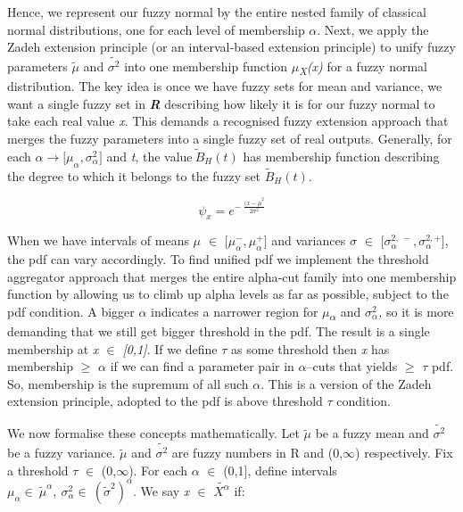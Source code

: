 \documentclass[12pt,a4paper]{report}
\numberwithin{equation}{section}
\begin{document}
Hence, we represent our fuzzy normal by the entire nested family of
classical normal distributions, one for each level of membership
\emph{$\alpha$}. Next, we apply the Zadeh extension principle (or an
interval‐based extension principle) to unify fuzzy parameters
\(\widetilde{\mu}\) and \(\widetilde{\sigma^{2}}\) into one membership
function \emph{$\mu$\textsubscript{X}(x)} for a fuzzy normal distribution.
The key idea is once we have fuzzy sets for mean and variance, we want a
single fuzzy set in \emph{\textbf{R}} describing how likely it is for
our fuzzy normal to take each real value \emph{x}. This demands a
recognised fuzzy extension approach that merges the fuzzy parameters
into a single fuzzy set of real outputs. Generally, for each
\({\alpha \longrightarrow \lbrack\mu}_{\alpha},\sigma_{\alpha}^{2}\rbrack\)
and \emph{t}, the value\({\widetilde{\ B}}_{H}(t)\) has membership
function describing the degree to which it belongs to the fuzzy set
\({\widetilde{B}}_{H}(t).\)

\[\psi_{x} = e^{- \ \frac{{(x - \mu}^{2}}{2\sigma^{2}}}\]

When we have intervals of means \emph{$\mu$ $\in$}
\(\lbrack\mu_{\alpha}^{-},\mu_{\alpha}^{+}\rbrack\) and variances
\emph{$\sigma$ $\in$}
\(\lbrack\sigma_{\alpha}^{2,\  -},\sigma_{\alpha}^{2, +}\rbrack\), the
pdf can vary accordingly. To find unified pdf we implement the threshold
aggregator approach that merges the entire alpha‐cut family into one
membership function by allowing us to climb up alpha levels as far as
possible, subject to the pdf condition. A bigger \emph{$\alpha$} indicates a
narrower region for \emph{$\mu$\textsubscript{$\alpha$}} and
\(\sigma_{\alpha}^{2}\)\emph{,} so it is more demanding that we still
get bigger threshold in the pdf. The result is a single membership at
\emph{x $\in$ {[}0,1{]}}. If we define \emph{$\tau$} as some threshold then
\emph{x} has membership $\geq$ \emph{$\alpha$} if we can find a parameter pair in
$\alpha$--cuts that yields $\geq$ \emph{$\tau$} pdf. So, membership is the supremum of all
such \emph{$\alpha$}. This is a version of the Zadeh extension principle,
adopted to the pdf is above threshold $\tau$ condition.

We now formalise these concepts mathematically. Let \(\widetilde{\mu}\)
be a fuzzy mean and \(\widetilde{\sigma^{2}}\) be a fuzzy variance.
\(\widetilde{\mu}\) and \(\widetilde{\sigma^{2}}\) are fuzzy numbers in
R and (0,$\infty$) respectively. Fix a threshold $\tau$ $\in$ (0,$\infty$). For each $\alpha$ $\in$
(0,1{]}, define intervals
\(\mu_{\alpha}\in\ {\widetilde{\mu}}^{\alpha},\ \sigma_{\alpha}^{2}\in\ \left(\widetilde{\sigma}^{2}\right)^{\alpha}\).
We say \emph{x $\in$} \(\widetilde{X^{\alpha}}\) if:
\end{document}

